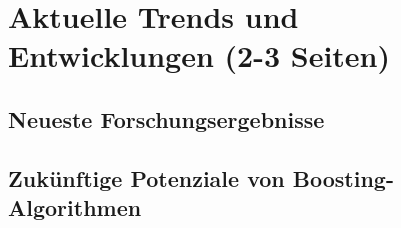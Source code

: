 \section{Aktuelle Trends und Entwicklungen (2-3 Seiten)}
\subsection{Neueste Forschungsergebnisse}
\subsection{Zukünftige Potenziale von Boosting-Algorithmen}